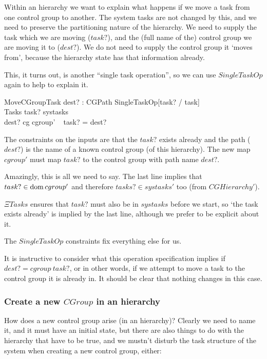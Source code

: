 \documentclass[a4paper,twoside,12pt]{article}
\begin{document}
Within an hierarchy we want to explain what happens if we move a task from one control group to another.
The system tasks are not changed by this, and we need to preserve the partitioning nature of the hierarchy. 
We need to supply the task which we are moving ($task?$), 
and the (full name of the) control group we are moving it to ($dest?$). 
We do not need to supply the control group it `moves from', because the hierarchy state has that information already.

This, it turns out, is another ``single task operation'', so we can use $SingleTaskOp$ again to help to explain it.

\begin{schema}{MoveCGroupTask}
dest? : CGPath
\also
SingleTaskOp[task? / task] \\
\Xi Tasks 
\where
task? \in systasks \\
dest? \in \dom cg
\also
cgroup' ~ task?  = dest?
\end{schema}
The constraints on the inputs are that the $task?$ exists already and 
the path ($dest?$) is the name of a known control group (of this hierarchy).
The new map $cgroup'$ must map $task?$ to the control group with path name $dest?$.

Amazingly, this is all we need to say. The last line implies that $task? \in \mathop{\mathrm{dom}} cgroup'$ and therefore
$tasks? \in systasks'$ too (from $CGHierarchy'$). 

$\Xi Tasks$ ensures that $task?$ must also be in $systasks$ before we start, so `the task exists already' is implied by the last line, although we prefer to be explicit about it.

The $SingleTaskOp$ constraints fix everything else for us.

It is instructive to consider what this operation specification implies if $dest? = cgroup ~ task?$, or in other words, if we
attempt to move a task to the control group it is already in. It should be clear that nothing changes in this case.

\subsubsection{Create a new $CGroup$ in an hierarchy}

How does a new control group arise (in an hierarchy)?
Clearly we need to name it, and it must have an initial state, but there are also things to do with the
hierarchy that have to be true, and we mustn't disturb the task structure of the system when
creating a new control group, either:
\end{document}
